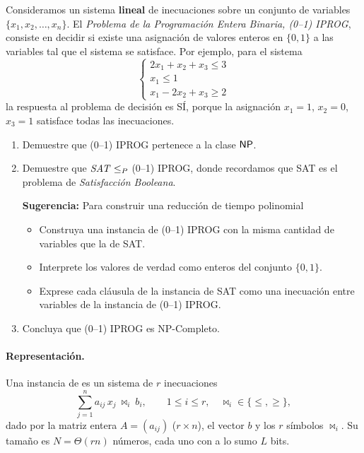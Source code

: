 \begin{enunciado}
Consideramos un sistema \textbf{lineal} de inecuaciones sobre un conjunto de variables
$\{x_1,x_2,\dots,x_n\}$. El \emph{Problema de la Programación Entera Binaria, (0--1) IPROG}, consiste en
decidir si existe una asignación de valores enteros en $\{0,1\}$ a las variables tal que el sistema se
satisface. Por ejemplo, para el sistema
\[
\begin{cases}
2x_1+x_2+x_3 \le 3\\
x_1 \le 1\\
x_1-2x_2+x_3 \ge 2
\end{cases}
\]
la respuesta al problema de decisión es SÍ, porque la asignación $x_1=1$, $x_2=0$, $x_3=1$ satisface todas
las inecuaciones.
\begin{enumerate}[label=(\alph*)]
  \item Demuestre que (0--1) IPROG pertenece a la clase $\mathsf{NP}$.
  \item Demuestre que $\mathit{SAT}\le_P$ (0--1) IPROG, donde recordamos que SAT es el problema de
  \emph{Satisfacción Booleana}.

  \textbf{Sugerencia:} Para construir una reducción de tiempo polinomial
  \begin{itemize}
    \item Construya una instancia de (0--1) IPROG con la misma cantidad de variables que la de SAT.
    \item Interprete los valores de verdad como enteros del conjunto $\{0,1\}$.
    \item Exprese cada cláusula de la instancia de SAT como una inecuación entre variables de la instancia de (0--1) IPROG.
  \end{itemize}
  \item Concluya que (0--1) IPROG es NP-Completo.
\end{enumerate}
\end{enunciado}


\paragraph{Representación.} Una instancia de \IPROG{} es un sistema de $r$ inecuaciones
\[
  \sum_{j=1}^n a_{ij}\,x_j \ \bowtie_i\ b_i, \qquad 1\le i\le r,\quad \bowtie_i\in\{\le,\ge\},
\]
dado por la matriz entera $A=(a_{ij})$ ($r\times n$), el vector $b$ y los $r$ símbolos $\bowtie_i$. Su tamaño es
$N=\Theta(rn)$ números, cada uno con a lo sumo $L$ bits.

